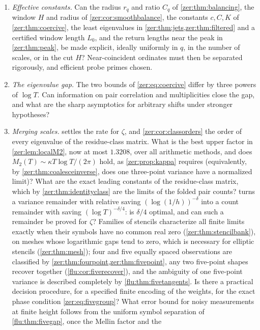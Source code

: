 \begin{enumerate}
\item \emph{Effective constants.} Can the radius $r_q$ and ratio $C_q$ of
\cref{zer:thm:balancing}, the window $H$ and radius of \cref{zer:cor:smoothbalance}, the
constants $c,C,K$ of \cref{zer:thm:coercive}, the least eigenvalues in
\cref{zer:thm:jets,zer:thm:filtered} and a certified window length $L_0$, and the return lengths
near the peak in \cref{zer:thm:peak}, be made explicit, ideally uniformly in $q$, in the number
of scales, or in the cut $H$? Near-coincident ordinates must then be separated rigorously, and
efficient probe primes chosen.
\item \emph{The eigenvalue gap.} The two bounds of \eqref{zer:eq:coercive} differ by three powers
of $\log T$. Can information on pair correlation and multiplicities close the gap, and what are
the sharp asymptotics for arbitrary shifts under stronger hypotheses?
\item \emph{Merging scales.}  settles the rate for $\zeta$, and
\cref{zer:cor:classorders} the order of every eigenvalue of the residue-class matrix. What is the best
upper factor in \cref{zer:lem:localM2}, now at most $1.3208$, over all arithmetic methods, and does
$M_2(T)\sim\kappa T\log T/(2\pi)$ hold, as \cref{zer:prop:kappa} requires (equivalently, by
\cref{zer:thm:coalesceinverse}, does one three-point variance have a normalized limit)? What are the
exact leading constants of the residue-class matrix, which by \cref{zer:thm:identityclass} are the
limits of the folded pair counts?  turns a variance remainder with relative saving
$(\log(1/h))^{-\delta}$ into a count remainder with saving $(\log T)^{-\delta/4}$: is $\delta/4$ optimal, and
can such a remainder be proved for $\zeta$? Families of stencils characterize all finite limits exactly
when their symbols have no common real zero (\cref{zer:thm:stencilbank}), on meshes whose logarithmic gaps
tend to zero, which is necessary for elliptic stencils (\cref{zer:thm:mesh}); four and five equally spaced
observations are classified by \cref{zer:thm:fourpoint,zer:thm:fivepoint}, any two five-point shapes recover
together (\cref{flu:cor:fiverecover}), and the ambiguity of one five-point variance is described completely by
\cref{flu:thm:fivetangents}. Is there a practical decision procedure, for a specified finite encoding of the
weights, for the exact phase condition \eqref{zer:eq:fivegroup}? What error bound for noisy measurements at
finite height follows from the uniform symbol separation of \cref{flu:thm:fivegap}, once the Mellin factor and the

\end{enumerate}
